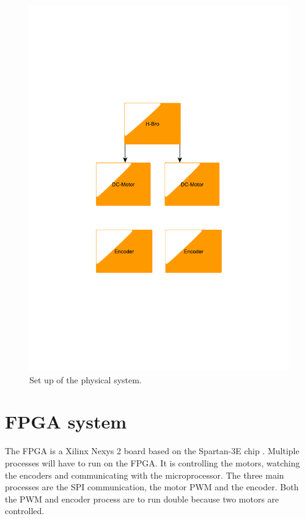 \begin{figure}[htb]
	\centering
	\includegraphics[scale=0.42,trim=200 200 200 200]{graphics/phsycicalsystem} %
	\caption{Set up of the physical system.}
	\label{fig:phsysicalsystem}			%
\end{figure}

\section{FPGA system}\label{sec:FPGA}

The FPGA is a Xilinx Nexys 2 board based on the Spartan-3E chip \cite{nexys2}. Multiple processes will have to run on the FPGA. It is controlling the motors, watching the encoders and communicating with the microprocessor. The three main processes are the SPI communication, the motor PWM and the encoder. Both the PWM and encoder process are to run double because two motors are controlled. 

